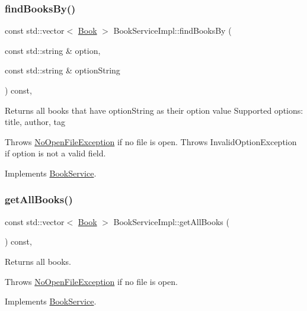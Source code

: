 \subsubsection{\texorpdfstring{find\+Books\+By()}{findBooksBy()}}
{\footnotesize\ttfamily const std\+::vector$<$ \hyperlink{classBook}{Book} $>$ Book\+Service\+Impl\+::find\+Books\+By (\begin{DoxyParamCaption}\item[{const std\+::string \&}]{option,  }\item[{const std\+::string \&}]{option\+String }\end{DoxyParamCaption}) const\hspace{0.3cm}{\ttfamily [override]}, {\ttfamily [virtual]}}

Returns all books that have option\+String as their option value Supported options\+: title, author, tag

Throws \hyperlink{structNoOpenFileException}{No\+Open\+File\+Exception} if no file is open. Throws Invalid\+Option\+Exception if option is not a valid field. 

Implements \hyperlink{classBookService_a07bfc2c15f92d0b7dafba7464eff48e1}{Book\+Service}.

\mbox{\label{classBookServiceImpl_a7ef55efcff6a50977de2a97ce156838f}} 
\subsubsection{\texorpdfstring{get\+All\+Books()}{getAllBooks()}}
{\footnotesize\ttfamily const std\+::vector$<$ \hyperlink{classBook}{Book} $>$ Book\+Service\+Impl\+::get\+All\+Books (\begin{DoxyParamCaption}{ }\end{DoxyParamCaption}) const\hspace{0.3cm}{\ttfamily [override]}, {\ttfamily [virtual]}}

Returns all books.

Throws \hyperlink{structNoOpenFileException}{No\+Open\+File\+Exception} if no file is open. 

Implements \hyperlink{classBookService_a032755934b16f7c93078b54aaf2f6128}{Book\+Service}.

\mbox{\label{classBookServiceImpl_adaf138469f4de2806de2a16aa92b288a}} 
